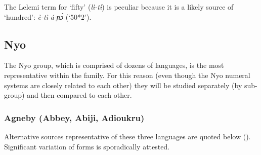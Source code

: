 The Lelemi term for ‘fifty’ (\textit{lì-tì}) is peculiar because it is a likely source of ‘hundred’: \textit{è-tì} \textit{á-ɲ{\'{ɔ}}} (‘50*2’). 

 
\subsection{Nyo}%
The Nyo group, which is comprised of dozens of languages, is the most representative within the family. For this reason (even though the Nyo numeral systems are closely related to each other) they will be studied separately (by sub-group) and then compared to each other. 

\newpage 
\subsubsection{Agneby (Abbey, Abiji, Adioukru)}%
Alternative sources representative of these three languages are quoted below (). Significant variation of forms is sporadically attested.

